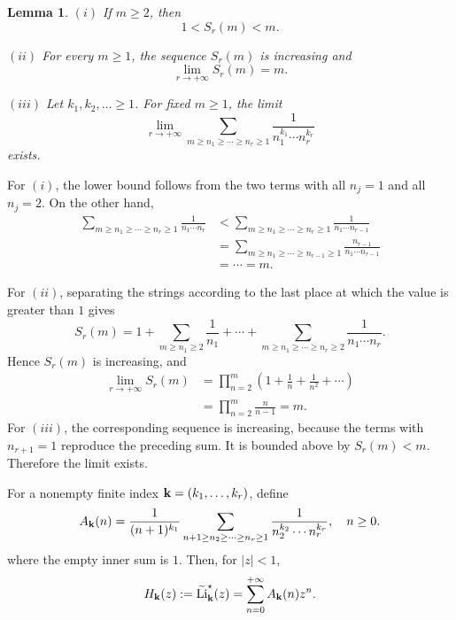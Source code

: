 \documentclass[12pt,a4paper]{amsart}
\makeatletter
\numberwithin{equation}{section}
\renewenvironment{proof}[1][Proof]{%
  \par\pushQED{\qed}%
  \normalfont\topsep6\p@\@plus6\p@\relax
  \trivlist
  \item[\hskip\labelsep\bfseries #1:]\ignorespaces
}{%
  \popQED\endtrivlist\@endpefalse
}
\theoremstyle{plain}
\newtheorem{lem}[Thm]{Lemma}
\theoremstyle{definition}
\makeatother
\begin{document}
\begin{lem}\label{lim}
$(i)$ If $m\geq 2$, then
\[
1<S_r(m)<m.
\]

$(ii)$ For every $m\geq 1$, the sequence $S_r(m)$ is increasing and
\[
\lim_{r\rightarrow+\infty}S_r(m)=m.
\]

$(iii)$ Let $k_1,k_2,\ldots\geq 1$.  For fixed $m\geq 1$, the limit
\[
\lim_{r\rightarrow+\infty}
\sum_{m\geq n_1\geq\cdots\geq n_r\geq 1}
\frac{1}{n_1^{k_1}\cdots n_r^{k_r}}
\]
exists.
\end{lem}

\begin{proof}
For $(i)$, the lower bound follows from the two terms with all $n_j=1$ and all $n_j=2$.  On the other hand,
\[
\begin{split}
\sum_{m\geq n_1\geq\cdots\geq n_r\geq 1}
\frac{1}{n_1\cdots n_r}
&<\sum_{m\geq n_1\geq\cdots\geq n_r\geq 1}
\frac{1}{n_1\cdots n_{r-1}}\\
&=\sum_{m\geq n_1\geq\cdots\geq n_{r-1}\geq 1}
\frac{n_{r-1}}{n_1\cdots n_{r-1}}\\
&=\cdots=m.
\end{split}
\]

For $(ii)$, separating the strings according to the last place at which the value is greater than $1$ gives
\[
S_r(m)=1+\sum_{m\geq n_1\geq 2}\frac1{n_1}+
\cdots+
\sum_{m\geq n_1\geq\cdots\geq n_r\geq 2}
\frac1{n_1\cdots n_r}.
\]
Hence $S_r(m)$ is increasing, and
\[
\begin{split}
\lim_{r\rightarrow+\infty}S_r(m)
&=\prod_{n=2}^{m}\left(1+\frac1n+\frac1{n^2}+\cdots\right)\\
&=\prod_{n=2}^{m}\frac{n}{n-1}=m.
\end{split}
\]
For $(iii)$, the corresponding sequence is increasing, because the terms with $n_{r+1}=1$ reproduce the preceding sum.  It is bounded above by $S_r(m)<m$.  Therefore the limit exists.
\end{proof}

For a nonempty finite index ${\bf k}=(k_1,\ldots,k_r)$, define
\begin{equation}\label{Adef}
A_{\bf k}(n)=\frac{1}{(n+1)^{k_1}}
\sum_{n+1\geq n_2\geq\cdots\geq n_r\geq 1}
\frac{1}{n_2^{k_2}\cdots n_r^{k_r}},\quad   n\geq 0.
\end{equation}
where the empty inner sum is $1$.  Then, for $|z|<1$,
\begin{equation}\label{Hseries}
H_{\bf k}(z):=\widetilde{\mathrm{Li}}^{\star}_{\bf k}(z)
=\sum_{n=0}^{+\infty}A_{\bf k}(n)z^n.
\end{equation}
\end{document}
